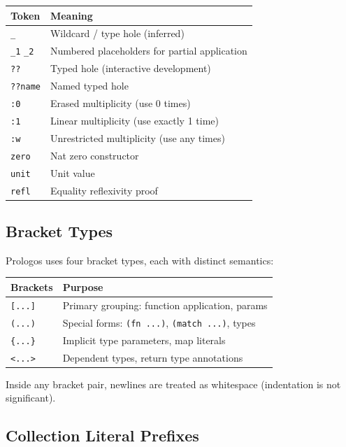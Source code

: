 \documentclass[11pt]{article}
\begin{document}
\begin{center}
\begin{tabular}{ll}
Token & Meaning\\
\hline
\texttt{\_} & Wildcard / type hole (inferred)\\
\texttt{\_1} \texttt{\_2} & Numbered placeholders for partial application\\
\texttt{??} & Typed hole (interactive development)\\
\texttt{??name} & Named typed hole\\
\texttt{:0} & Erased multiplicity (use 0 times)\\
\texttt{:1} & Linear multiplicity (use exactly 1 time)\\
\texttt{:w} & Unrestricted multiplicity (use any times)\\
\texttt{zero} & Nat zero constructor\\
\texttt{unit} & Unit value\\
\texttt{refl} & Equality reflexivity proof\\
\end{tabular}
\end{center}
\subsection{Bracket Types}
\label{sec:org80089dc}

Prologos uses four bracket types, each with distinct semantics:

\begin{center}
\begin{tabular}{ll}
Brackets & Purpose\\
\hline
\texttt{[...]} & Primary grouping: function application, params\\
\texttt{(...)} & Special forms: \texttt{(fn ...)}, \texttt{(match ...)}, types\\
\texttt{\{...\}} & Implicit type parameters, map literals\\
\texttt{<...>} & Dependent types, return type annotations\\
\end{tabular}
\end{center}

Inside any bracket pair, newlines are treated as whitespace (indentation is not
significant).
\subsection{Collection Literal Prefixes}
\label{sec:orgd967663}
\end{document}
